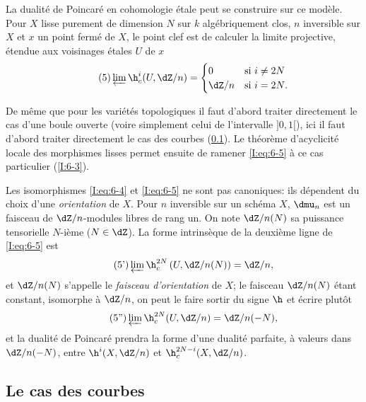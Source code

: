 La dualité de Poincaré en cohomologie étale peut se construire sur ce 
modèle. Pour $X$ lisse purement de dimension $N$ sur $k$ algébriquement clos, 
$n$ inversible sur $X$ et $x$ un point fermé de $X$, le point clef est de 
calculer la limite projective, étendue aux voisinages étales $U$ de $x$ 
\begin{equation}\tag{5}\label{I:eq:6-5}
  \varprojlim \h_c^i(U,\dZ/n) 
    = \begin{cases}
        0     & \text{si $i\ne 2N$} \\
        \dZ/n & \text{si $i=2N$.}
      \end{cases} 
\end{equation}

De même que pour les variétés topologiques il faut d'abord traiter 
directement le cas d'une boule ouverte (voire simplement celui de l'intervalle 
$]0,1[$), ici il faut d'abord traiter directement le cas des courbes 
(\ref{I:6-2}). Le théorème d'acyclicité locale des morphismes lisses 
permet ensuite de ramener \eqref{I:eq:6-5} à ce cas particulier (\ref{I:6-3}). 

Les isomorphismes \eqref{I:eq:6-4} et \eqref{I:eq:6-5} ne sont pas canoniques: 
ils dépendent du choix d'une \emph{orientation} de $X$. Pour $n$ inversible 
sur un schéma $X$, $\dmu_n$ est un faisceau de $\dZ/n$-modules libres de rang 
un. On note $\dZ/n(N)$ sa puissance tensorielle $N$-ième ($N\in\dZ$). La 
forme intrinsèque de la deuxième ligne de \eqref{I:eq:6-5} est 
\begin{equation}\tag{5'}\label{I:eq:6-5'}
  \varprojlim \h_c^{2N} \left(U,\dZ/n(N)\right) = \dZ/n \text{,}
\end{equation}
et $\dZ/n(N)$ s'appelle le \emph{faisceau d'orientation} de $X$; le faisceau 
$\dZ/n(N)$ étant constant, isomorphe à $\dZ/n$, on peut le faire sortir 
du signe $\h$ et écrire plutôt
\begin{equation}\tag{5''}\label{I:eq:6-5''}
  \varprojlim \h_c^{2N} (U,\dZ/n) = \dZ/n(-N) \text{,}
\end{equation}
et la dualité de Poincaré prendra la forme d'une dualité parfaite, à 
valeurs dans $\dZ/n(-N)$, entre $\h^i(X,\dZ/n)$ et $\h_c^{2N-i}(X,\dZ/n)$. 










\subsection{Le cas des courbes}\label{I:6-2}





